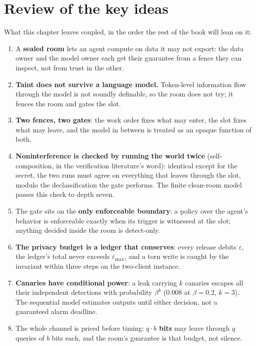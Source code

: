 \documentclass[11pt,a4paper]{article}
\theoremstyle{definition}
\begin{document}
\section*{Review of the key ideas}
What this chapter leaves coupled, in the order the rest of the book will lean on it:

\begin{enumerate}[leftmargin=1.6em,itemsep=2pt]
\item A \textbf{sealed room} lets an agent compute on data it may not export: the data owner and the model owner each get their guarantee from a fence they can inspect, not from trust in the other.
\item \textbf{Taint does not survive a language model.} Token-level information flow through the model is not soundly definable, so the room does not try; it fences the room and gates the slot.
\item \textbf{Two fences, two gates}: the work order fixes what may enter, the slot fixes what may leave, and the model in between is treated as an opaque function of both.
\item \textbf{Noninterference is checked by running the world twice} (self-composition, in the verification literature's word): identical except for the secret, the two runs must agree on everything that leaves through the slot, modulo the declassification the gate performs. The finite clean-room model passes this check to depth seven.
\item The gate sits on the \textbf{only enforceable boundary}: a policy over the agent's behavior is enforceable exactly when its trigger is witnessed at the slot; anything decided inside the room is detect-only.
\item \textbf{The privacy budget is a ledger that conserves}: every release debits $\varepsilon$, the ledger's total never exceeds $\varepsilon_{\max}$, and a torn write is caught by the invariant within three steps on the two-client instance.
\item \textbf{Canaries have conditional power}: a leak carrying $k$ canaries escapes all their independent detections with probability $\beta^{k}$ ($0.008$ at $\beta=0.2$, $k=3$). The sequential model estimates outputs until either decision, not a guaranteed alarm deadline.
\item The whole channel is priced before timing: \textbf{$q \cdot b$ bits} may leave through $q$ queries of $b$ bits each, and the room's guarantee is that budget, not silence.
\end{enumerate}
\end{document}
